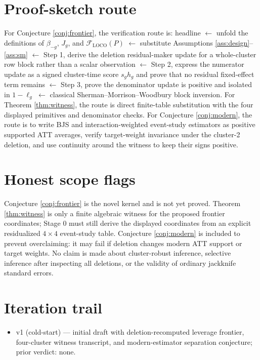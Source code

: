 \documentclass[11pt]{article}
\theoremstyle{definition}
\theoremstyle{plain}
\theoremstyle{remark}
\begin{document}
\section{Proof-sketch route}
For Conjecture \ref{conj:frontier}, the verification route is: headline $\leftarrow$ unfold the definitions of $\beta_{-g}$, $J_g$, and $\mathcal{F}_{\mathrm{LOCO}}(P)$ $\leftarrow$ substitute Assumptions \ref{ass:design}--\ref{ass:sm} $\leftarrow$ Step 1, derive the deletion residual-maker update for a whole-cluster row block rather than a scalar observation $\leftarrow$ Step 2, express the numerator update as a signed cluster-time score $s_g h_g$ and prove that no residual fixed-effect term remains $\leftarrow$ Step 3, prove the denominator update is positive and isolated in $1-\ell_g$ $\leftarrow$ classical Sherman--Morrison--Woodbury block inversion. For Theorem \ref{thm:witness}, the route is direct finite-table substitution with the four displayed primitives and denominator checks. For Conjecture \ref{conj:modern}, the route is to write BJS and interaction-weighted event-study estimators as positive supported ATT averages, verify target-weight invariance under the cluster-2 deletion, and use continuity around the witness to keep their signs positive.

\section{Honest scope flags}
Conjecture \ref{conj:frontier} is the novel kernel and is not yet proved. Theorem \ref{thm:witness} is only a finite algebraic witness for the proposed frontier coordinates; Stage 0 must still derive the displayed coordinates from an explicit residualized $4\times4$ event-study table. Conjecture \ref{conj:modern} is included to prevent overclaiming: it may fail if deletion changes modern ATT support or target weights. No claim is made about cluster-robust inference, selective inference after inspecting all deletions, or the validity of ordinary jackknife standard errors.

\section{Iteration trail}
\begin{itemize}[leftmargin=*]
\item v1 (cold-start) --- initial draft with deletion-recomputed leverage frontier, four-cluster witness transcript, and modern-estimator separation conjecture; prior verdict: none.
\end{itemize}
\end{document}
